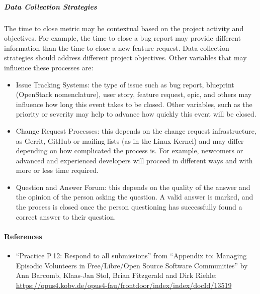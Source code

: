 \hypertarget{data-collection-strategies}{%
\subparagraph{Data Collection
Strategies}\label{data-collection-strategies}}

The time to close metric may be contextual based on the project activity
and objectives. For example, the time to close a bug report may provide
different information than the time to close a new feature request. Data
collection strategies should address different project objectives. Other
variables that may influence these processes are:

\begin{itemize}
\tightlist
\item
  Issue Tracking Systems: the type of issue such as bug report,
  blueprint (OpenStack nomenclature), user story, feature request, epic,
  and others may influence how long this event takes to be closed. Other
  variables, such as the priority or severity may help to advance how
  quickly this event will be closed.
\item
  Change Request Processes: this depends on the change request
  infrastructure, as Gerrit, GitHub or mailing lists (as in the Linux
  Kernel) and may differ depending on how complicated the process is.
  For example, newcomers or advanced and experienced developers will
  proceed in different ways and with more or less time required.
\item
  Question and Answer Forum: this depends on the quality of the answer
  and the opinion of the person asking the question. A valid answer is
  marked, and the process is closed once the person questioning has
  successfully found a correct answer to their question.
\end{itemize}

\hypertarget{references}{%
\paragraph{References}\label{references}}

\begin{itemize}
\tightlist
\item
  ``Practice P.12: Respond to all submissions'' from ``Appendix to:
  Managing Episodic Volunteers in Free/Libre/Open Source Software
  Communities'' by Ann Barcomb, Klaas-Jan Stol, Brian Fitzgerald and
  Dirk Riehle:
  \href{https://opus4.kobv.de/opus4-fau/frontdoor/index/index/docId/13519}{https://opus4.kobv.de/opus4-fau/frontdoor/index/index/docId/13519}
\end{itemize}

